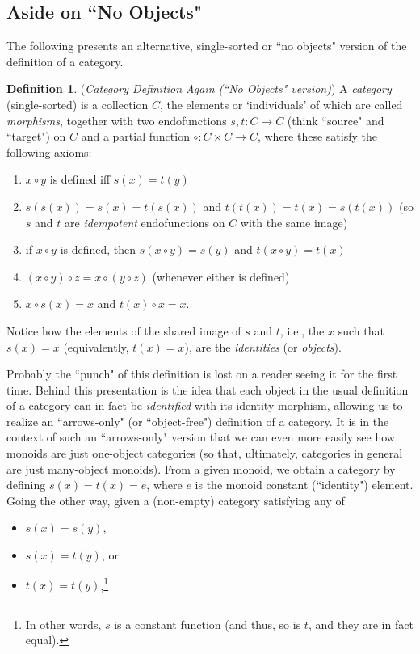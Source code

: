 \documentclass[11pt]{book}
\theoremstyle{definition}
\theoremstyle{definition}
\newtheorem{definition}{Definition}[section]
\theoremstyle{definition}
\theoremstyle{theorem}
\theoremstyle{definition}
\begin{document}
\subsection{Aside on ``No Objects"}
\label{sec: No Objects}
The following presents an alternative, single-sorted or ``no objects" version of the definition of a category.
\begin{definition}
	 (\textit{Category Definition Again (``No Objects" version)}) A \textit{category} (single-sorted)  is a collection $C$, the elements or `individuals' of which are called \textit{morphisms}, together with two endofunctions $s, t: C \rightarrow C$ (think ``source" and ``target") on $C$ and a partial function $\circ: C \times C \rightarrow C$, where these satisfy the following axioms: 
	\begin{enumerate}
		\item $x \circ y$ is defined iff $s(x) = t(y)$
		\item $s(s(x)) = s(x) = t(s(x))$ and $t(t(x)) = t(x) = s(t(x))$ (so $s$ and $t$ are \textit{idempotent} endofunctions on $C$ with the same image)
		\item if $x \circ y$ is defined, then $s(x \circ y) = s(y)$ and $t(x \circ y) = t(x)$
		\item $(x \circ y) \circ z = x \circ (y \circ z)$ (whenever either is defined)
		\item $x \circ s(x) = x$ and $t(x) \circ x = x$. 
	\end{enumerate}
\end{definition}
Notice how the elements of the shared image of $s$ and $t$, i.e., the $x$ such that $s(x) = x$ (equivalently, $t(x) = x$), are the \textit{identities} (or \textit{objects}). \par 
Probably the ``punch" of this definition is lost on a reader seeing it for the first time. Behind this presentation is the idea that each object in the usual definition of a category can in fact be \textit{identified} with its identity morphism, allowing us to realize an ``arrows-only" (or ``object-free") definition of a category. It is in the context of such an ``arrows-only" version that we can even more easily see how monoids are just one-object categories (so that, ultimately, categories in general are just many-object monoids). From a given monoid, we obtain a category by defining $s(x) = t(x) = e$, where $e$ is the monoid constant (``identity") element. Going the other way, given a (non-empty) category satisfying any of 
\begin{itemize}
	\item $s(x) = s(y)$,
	\item $s(x) = t(y)$, or 
	\item $t(x) = t(y)$,\footnote{In other words, $s$ is a constant function (and thus, so is $t$, and they are in fact equal).}
\end{itemize} 
\end{document}
